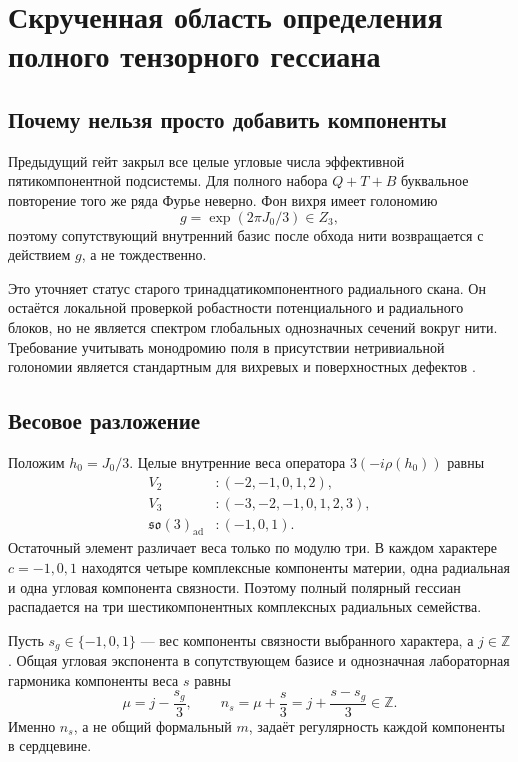\chapter{Скрученная область определения полного тензорного гессиана}
\label{ch:v6-bosonic-defect-full-tensor-polar-hessian-gate}

\section{Почему нельзя просто добавить компоненты}

Предыдущий гейт закрыл все целые угловые числа эффективной
пятикомпонентной подсистемы. Для полного набора $Q+T+B$ буквальное повторение
того же ряда Фурье неверно. Фон вихря имеет голономию
\begin{equation}
 g=\exp(2\pi J_0/3)\in Z_3,
\end{equation}
поэтому сопутствующий внутренний базис после обхода нити возвращается с
действием $g$, а не тождественно.

Это уточняет статус старого тринадцатикомпонентного радиального скана. Он
остаётся локальной проверкой робастности потенциального и радиального блоков,
но не является спектром глобальных однозначных сечений вокруг нити. Требование
учитывать монодромию поля в присутствии нетривиальной голономии является
стандартным для вихревых и поверхностных дефектов
\cite{full-tensor-bucher-alice,full-tensor-gomis-surface}.

\section{Весовое разложение}

Положим $h_0=J_0/3$. Целые внутренние веса оператора $3(-i\rho(h_0))$
равны
\begin{align}
 V_2 &: (-2,-1,0,1,2),\\
 V_3 &: (-3,-2,-1,0,1,2,3),\\
 \mathfrak{so}(3)_{\mathrm{ad}} &: (-1,0,1).
\end{align}
Остаточный элемент различает веса только по модулю три. В каждом характере
$c=-1,0,1$ находятся четыре комплексные компоненты материи, одна радиальная
и одна угловая компонента связности. Поэтому полный полярный гессиан
распадается на три шестикомпонентных комплексных радиальных семейства.

Пусть $s_g\in\{-1,0,1\}$ --- вес компоненты связности выбранного характера,
а $j\in\mathbb Z$. Общая угловая экспонента в сопутствующем базисе и
однозначная лабораторная гармоника компоненты веса $s$ равны
\begin{equation}
 \mu=j-\frac{s_g}{3},
 \qquad
 n_s=\mu+\frac{s}{3}
     =j+\frac{s-s_g}{3}\in\mathbb Z.
 \label{eq:v6-full-tensor-twisted-harmonic-rule}
\end{equation}
Именно $n_s$, а не общий формальный $m$, задаёт регулярность каждой
компоненты в сердцевине.

